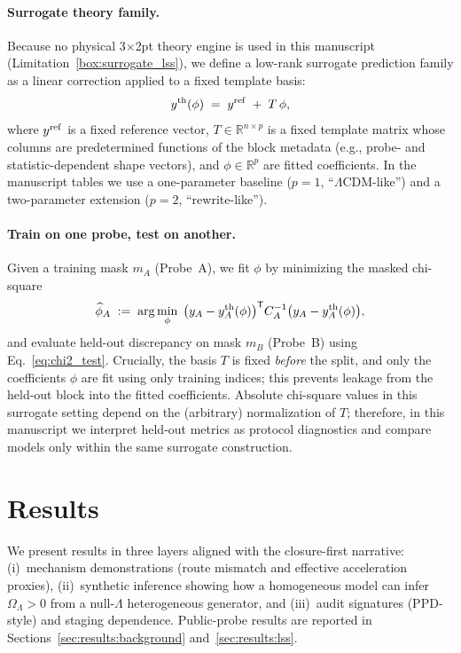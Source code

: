 \documentclass[11pt]{article}
\theoremstyle{definition}
\theoremstyle{plain}
\theoremstyle{remark}
\begin{document}
\paragraph{Surrogate theory family.}
Because no physical 3$\times$2pt theory engine is used in this manuscript (Limitation~\ref{box:surrogate_lss}), we define a low-rank surrogate prediction family as a linear correction applied to a fixed template basis:
\begin{equation}
y^{\rm th}(\phi) \;=\; y^{\rm ref} \;+\; T\,\phi,
\label{eq:lss_surrogate_model}
\end{equation}
where $y^{\rm ref}$ is a fixed reference vector, $T\in\mathbb{R}^{n\times p}$ is a fixed template matrix whose columns are predetermined functions of the block metadata (e.g., probe- and statistic-dependent shape vectors), and $\phi\in\mathbb{R}^p$ are fitted coefficients.
In the manuscript tables we use a one-parameter baseline ($p=1$, ``$\Lambda$CDM-like'') and a two-parameter extension ($p=2$, ``rewrite-like'').

\paragraph{Train on one probe, test on another.}
Given a training mask $m_A$ (Probe~A), we fit $\phi$ by minimizing the masked chi-square
\begin{equation}
\widehat{\phi}_A \;:=\; \arg\min_{\phi}\;
\big(y_A - y^{\rm th}_A(\phi)\big)^{\mathsf T} C_A^{-1}\big(y_A - y^{\rm th}_A(\phi)\big),
\label{eq:lss_surrogate_fit}
\end{equation}
and evaluate held-out discrepancy on mask $m_B$ (Probe~B) using Eq.~\eqref{eq:chi2_test}.
Crucially, the basis $T$ is fixed \emph{before} the split, and only the coefficients $\phi$ are fit using only training indices; this prevents leakage from the held-out block into the fitted coefficients.
Absolute chi-square values in this surrogate setting depend on the (arbitrary) normalization of $T$; therefore, in this manuscript we interpret held-out metrics as protocol diagnostics and compare models only within the same surrogate construction.

\section{Results}\label{sec:results}
We present results in three layers aligned with the closure-first narrative: (i)~mechanism demonstrations (route mismatch and effective acceleration proxies), (ii)~synthetic inference showing how a homogeneous model can infer $\Omega_\Lambda>0$ from a null-$\Lambda$ heterogeneous generator, and (iii)~audit signatures (PPD-style) and staging dependence. Public-probe results are reported in Sections~\ref{sec:results:background} and~\ref{sec:results:lss}.
\end{document}
